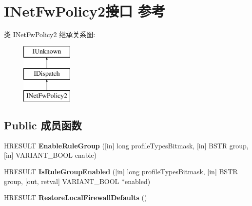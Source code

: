 \hypertarget{interface_i_net_fw_policy2}{}\section{I\+Net\+Fw\+Policy2接口 参考}
\label{interface_i_net_fw_policy2}
类 I\+Net\+Fw\+Policy2 继承关系图\+:\begin{figure}[H]
\begin{center}
\leavevmode
\includegraphics[height=3.000000cm]{interface_i_net_fw_policy2}
\end{center}
\end{figure}
\subsection*{Public 成员函数}
\begin{DoxyCompactItemize}
\item 
\mbox{\label{interface_i_net_fw_policy2_a65acb4d0e147841594f7ff1840b42157}} 
H\+R\+E\+S\+U\+LT {\bfseries Enable\+Rule\+Group} (\mbox{[}in\mbox{]} long profile\+Types\+Bitmask, \mbox{[}in\mbox{]} B\+S\+TR group, \mbox{[}in\mbox{]} V\+A\+R\+I\+A\+N\+T\+\_\+\+B\+O\+OL enable)
\item 
\mbox{\label{interface_i_net_fw_policy2_a1e968b5f4293d5efc3fec319722542fe}} 
H\+R\+E\+S\+U\+LT {\bfseries Is\+Rule\+Group\+Enabled} (\mbox{[}in\mbox{]} long profile\+Types\+Bitmask, \mbox{[}in\mbox{]} B\+S\+TR group, \mbox{[}out, retval\mbox{]} V\+A\+R\+I\+A\+N\+T\+\_\+\+B\+O\+OL $\ast$enabled)
\item 
\mbox{\label{interface_i_net_fw_policy2_a29eeb0f288a210aedff2b67f4de168a6}} 
H\+R\+E\+S\+U\+LT {\bfseries Restore\+Local\+Firewall\+Defaults} ()
\end{DoxyCompactItemize}

